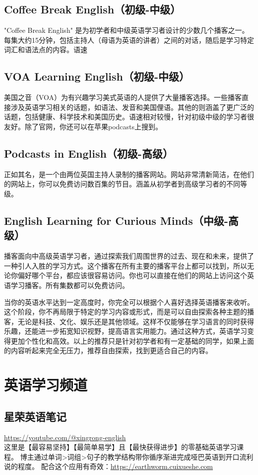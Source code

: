 \documentclass[11pt]{article}
\begin{document}
\subsection{Coffee Break English（初级-中级）}
\label{sec:orgd04c0b8}
"Coffee Break English" 是为初学者和中级英语学习者设计的少数几个播客之一。每集大约15分钟，包括主持人（母语为英语的讲者）之间的对话，随后是学习特定词汇和语法点的内容。语速

\subsection{VOA Learning English（初级-中级）}
\label{sec:org7286b01}
美国之音（VOA）为有兴趣学习美式英语的人提供了大量播客选择。一些播客直接涉及英语学习相关的话题，如语法、发音和美国俚语。其他的则涵盖了更广泛的话题，包括健康、科学技术和美国历史。语速相对较慢，针对初级中级的学习者很友好。除了官网，你还可以在苹果podcasts上搜到。
\subsection{Podcasts in English（初级-高级）}
\label{sec:org50f6252}
正如其名，是一个由两位英国主持人录制的播客网站。网站非常清新简洁，在他们的网站上，你可以免费访问数百集的节目。涵盖从初学者到高级学习者的不同等级。

\subsection{English Learning for Curious Minds（中级-高级）}
\label{sec:org1c38996}
播客面向中高级英语学习者，通过探索我们周围世界的过去、现在和未来，提供了一种引人入胜的学习方式。这个播客在所有主要的播客平台上都可以找到，所以无论你偏好哪个平台，都应该很容易访问。你也可以直接在他们的网站上访问这个英语学习播客。所有集数都可以免费访问。

当你的英语水平达到一定高度时，你完全可以根据个人喜好选择英语播客来收听。这个阶段，你不再局限于特定的学习内容或形式，而是可以自由探索各种主题的播客，无论是科技、文化、娱乐还是其他领域。这样不仅能够在学习语言的同时获得乐趣，还能进一步拓宽知识视野，提高语言实用能力。通过这种方式，英语学习变得更加个性化和高效。以上的推荐只是针对初学者和有一定基础的同学，如果上面的内容听起来完全无压力，推荐自由探索，找到更适合自己的内容。

\section{英语学习频道}
\label{sec:org560a80b}
\subsection{星荣英语笔记}
\label{sec:orge052c69}
\url{https://youtube.com/@xingrong-english} \\
这里是【最容易坚持】【最简单易学】且【最快获得进步】的零基础英语学习课程。
博主通过单词>词组>句子的教学结构带你循序渐进完成哑巴英语到开口流利说的程度。
配合这个应用有奇效：\url{https://earthworm.cuixueshe.com}
\end{document}

